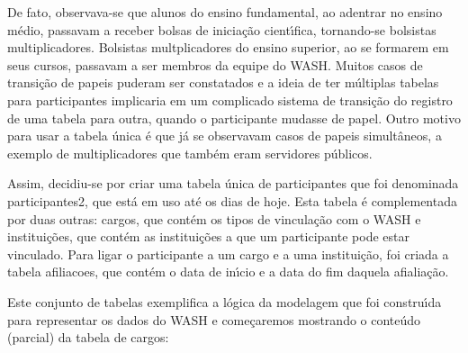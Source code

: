 \documentclass[
12pt,		%
openright,	%
twoside,  %
a4paper,			%
chapter=TITLE,		%
english,			%
french,				%
spanish,			%
brazil				%
]{USPSC-classe/USPSC}
\begin{document}
De fato, observava-se que alunos do ensino fundamental, ao adentrar no ensino m\'edio, passavam a receber bolsas de inicia\c{c}\~ao cient\'{\i}fica, tornando-se bolsistas multiplicadores. Bolsistas multplicadores do ensino superior, ao se formarem em seus cursos, passavam a ser membros da equipe do WASH. Muitos casos de transi\c{c}\~ao de papeis puderam ser constatados e a ideia de ter m\'ultiplas tabelas para participantes implicaria em um complicado sistema de transi\c{c}\~ao do registro de uma tabela para outra, quando o participante mudasse de papel. Outro motivo para usar a tabela \'unica \'e que j\'a se observavam casos de papeis simult\^aneos, a exemplo de multiplicadores que tamb\'em eram servidores p\'ublicos.


Assim, decidiu-se por criar uma tabela \'unica de participantes que foi denominada \textquotedbl participantes2\textquotedbl , que est\'a em uso at\'e os dias de hoje. Esta tabela \'e complementada por duas outras: \textquotedbl cargos\textquotedbl , que cont\'em os tipos de vincula\c{c}\~ao com o WASH e \textquotedbl institui\c{c}\~oes\textquotedbl , que cont\'em as institui\c{c}\~oes a que um participante pode estar vinculado. Para ligar o participante a um cargo e a uma institui\c{c}\~ao, foi criada a tabela \textquotedbl afiliacoes\textquotedbl , que cont\'em o data de in\'{\i}cio e a data do fim daquela afialia\c{c}\~ao.


Este conjunto de tabelas exemplifica a l\'ogica da modelagem que foi constru\'{\i}da para representar os dados do WASH e come\c{c}aremos mostrando o conte\'udo (parcial) da tabela de \textquotedbl cargos\textquotedbl :
\end{document}

